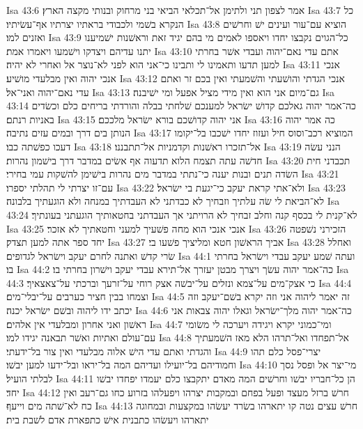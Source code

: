 Isa 43:6  אמר לצפון תני ולתימן אל־תכלאי הביאי בני מרחוק ובנותי מקצה הארץ׃
Isa 43:7  כל הנקרא בשׁמי ולכבודי בראתיו יצרתיו אף־עשׂיתיו׃
Isa 43:8  הוציא עם־עור ועינים ישׁ וחרשׁים ואזנים למו׃
Isa 43:9  כל־הגוים נקבצו יחדו ויאספו לאמים מי בהם יגיד זאת וראשׁנות ישׁמיענו יתנו עדיהם ויצדקו וישׁמעו ויאמרו אמת׃
Isa 43:10  אתם עדי נאם־יהוה ועבדי אשׁר בחרתי למען תדעו ותאמינו לי ותבינו כי־אני הוא לפני לא־נוצר אל ואחרי לא יהיה׃
Isa 43:11  אנכי אנכי יהוה ואין מבלעדי מושׁיע׃
Isa 43:12  אנכי הגדתי והושׁעתי והשׁמעתי ואין בכם זר ואתם עדי נאם־יהוה ואני־אל׃
Isa 43:13  גם־מיום אני הוא ואין מידי מציל אפעל ומי ישׁיבנה׃
Isa 43:14  כה־אמר יהוה גאלכם קדושׁ ישׂראל למענכם שׁלחתי בבלה והורדתי בריחים כלם וכשׂדים באניות רנתם׃
Isa 43:15  אני יהוה קדושׁכם בורא ישׂראל מלככם׃
Isa 43:16  כה אמר יהוה הנותן בים דרך ובמים עזים נתיבה׃
Isa 43:17  המוציא רכב־וסוס חיל ועזוז יחדו ישׁכבו בל־יקומו דעכו כפשׁתה כבו׃
Isa 43:18  אל־תזכרו ראשׁנות וקדמניות אל־תתבננו׃
Isa 43:19  הנני עשׂה חדשׁה עתה תצמח הלוא תדעוה אף אשׂים במדבר דרך בישׁמון נהרות׃
Isa 43:20  תכבדני חית השׂדה תנים ובנות יענה כי־נתתי במדבר מים נהרות בישׁימן להשׁקות עמי בחירי׃
Isa 43:21  עם־זו יצרתי לי תהלתי יספרו׃
Isa 43:22  ולא־אתי קראת יעקב כי־יגעת בי ישׂראל׃
Isa 43:23  לא־הביאת לי שׂה עלתיך וזבחיך לא כבדתני לא העבדתיך במנחה ולא הוגעתיך בלבונה׃
Isa 43:24  לא־קנית לי בכסף קנה וחלב זבחיך לא הרויתני אך העבדתני בחטאותיך הוגעתני בעונתיך׃
Isa 43:25  אנכי אנכי הוא מחה פשׁעיך למעני וחטאתיך לא אזכר׃
Isa 43:26  הזכירני נשׁפטה יחד ספר אתה למען תצדק׃
Isa 43:27  אביך הראשׁון חטא ומליציך פשׁעו בי׃
Isa 43:28  ואחלל שׂרי קדשׁ ואתנה לחרם יעקב וישׂראל לגדופים׃
Isa 44:1  ועתה שׁמע יעקב עבדי וישׂראל בחרתי בו׃
Isa 44:2  כה־אמר יהוה עשׂך ויצרך מבטן יעזרך אל־תירא עבדי יעקב וישׁרון בחרתי בו׃
Isa 44:3  כי אצק־מים על־צמא ונזלים על־יבשׁה אצק רוחי על־זרעך וברכתי על־צאצאיך׃
Isa 44:4  וצמחו בבין חציר כערבים על־יבלי־מים׃
Isa 44:5  זה יאמר ליהוה אני וזה יקרא בשׁם־יעקב וזה יכתב ידו ליהוה ובשׁם ישׂראל יכנה׃
Isa 44:6  כה־אמר יהוה מלך־ישׂראל וגאלו יהוה צבאות אני ראשׁון ואני אחרון ומבלעדי אין אלהים׃
Isa 44:7  ומי־כמוני יקרא ויגידה ויערכה לי משׂומי עם־עולם ואתיות ואשׁר תבאנה יגידו למו׃
Isa 44:8  אל־תפחדו ואל־תרהו הלא מאז השׁמעתיך והגדתי ואתם עדי הישׁ אלוה מבלעדי ואין צור בל־ידעתי׃
Isa 44:9  יצרי־פסל כלם תהו וחמודיהם בל־יועילו ועדיהם המה בל־יראו ובל־ידעו למען יבשׁו׃
Isa 44:10  מי־יצר אל ופסל נסך לבלתי הועיל׃
Isa 44:11  הן כל־חבריו יבשׁו וחרשׁים המה מאדם יתקבצו כלם יעמדו יפחדו יבשׁו יחד׃
Isa 44:12  חרשׁ ברזל מעצד ופעל בפחם ובמקבות יצרהו ויפעלהו בזרוע כחו גם־רעב ואין כח לא־שׁתה מים וייעף׃
Isa 44:13  חרשׁ עצים נטה קו יתארהו בשׂרד יעשׂהו במקצעות ובמחוגה יתארהו ויעשׂהו כתבנית אישׁ כתפארת אדם לשׁבת בית׃
